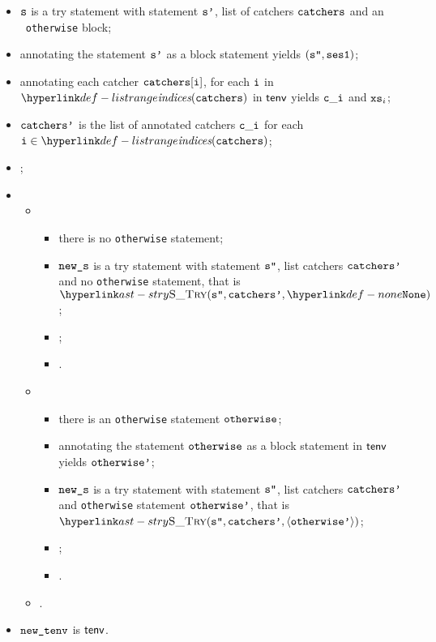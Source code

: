 \ProseParagraph
\AllApply
\begin{itemize}
  \item $\texttt{s}$ is a try statement with statement $\texttt{s'}$, list of catchers $\texttt{catchers}$ and an \optional\ \texttt{otherwise} block;
  \item annotating the statement $\texttt{s'}$ as a block statement yields $(\texttt{s''}, \texttt{ses1})$\ProseOrTypeError;
  \item annotating each catcher $\texttt{catchers}[\texttt{i}]$, for each $\texttt{i}$ in $\listrange(\catchers)$ in $\textsf{tenv}$ yields $\texttt{c}\_\texttt{i}$
        and $\texttt{xs}_i$\ProseOrTypeError;
  \item $\texttt{catchers'}$ is the list of annotated catchers $\texttt{c}\_\texttt{i}$ for each $\vi\in\listrange(\catchers)$;
  \item {};
  \item \OneApplies
  \begin{itemize}
    \item {}
    \begin{itemize}
      \item there is no \texttt{otherwise} statement;
      \item $\texttt{new\_s}$ is a try statement with statement $\texttt{s''}$, list catchers $\texttt{catchers'}$ and no \texttt{otherwise} statement,
            that is \\
            $\STry(\vspp, \catchersp, \None)$;
      \item {};
      \item \Proseeqdef{$\vsesthree$}{$\vsestwo$}.
    \end{itemize}

    \item {}
    \begin{itemize}
      \item there is an \texttt{otherwise} statement $\texttt{otherwise}$;
      \item annotating the statement $\texttt{otherwise}$ as a block statement in $\textsf{tenv}$ yields $\texttt{otherwise'}$\ProseOrTypeError;
      \item $\texttt{new\_s}$ is a try statement with statement $\texttt{s''}$, list catchers $\texttt{catchers'}$ and \texttt{otherwise} statement
            $\texttt{otherwise'}$, that is \\
            $\STry(\vspp, \catchersp, \langle\otherwisep\rangle)$;
      \item \Proseeqdef{$\vsesotherwise$}{$\vsesblock$};
      \item \Proseeqdef{$\vsesthree$}{$\vsestwo$}.
    \end{itemize}

    \item {}.
  \end{itemize}
  \item $\texttt{new\_tenv}$ is $\textsf{tenv}$.
\end{itemize}

